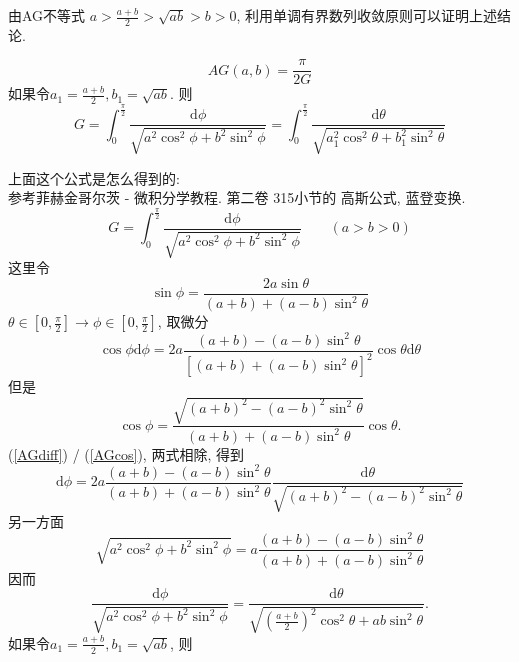 由AG不等式 $ a>\frac{a+b}{2}>\sqrt{ab}>b>0 $, 
利用单调有界数列收敛原则可以证明上述结论.

\begin{equation}\label{AGineqAns}
	AG(a,b)=\frac{\pi}{2G}
\end{equation}
如果令$ a_1 = \frac{a+b}{2}, b_1 = \sqrt{ab} $. 则
\begin{equation}\label{GaussAGineqInt}
	G = \int_{0}^{\frac{\pi}{2}}\frac{\text{d}\phi}{\sqrt{a^2\cos^2\phi+b^2\sin^2\phi}} 
	= \int_{0}^{\frac{\pi}{2}}\frac{\text{d}\theta}{\sqrt{a_1^2\cos^2\theta+b_1^2\sin^2\theta}} 
\end{equation}

上面这个公式是怎么得到的:\\
参考菲赫金哥尔茨 - 微积分学教程. 第二卷 315小节的 高斯公式, 蓝登变换.\\
\begin{equation}\label{GaussAGineqInt001}
	G = \int_{0}^{\frac{\pi}{2}}\frac{\text{d}\phi}{\sqrt{a^2\cos^2\phi+b^2\sin^2\phi}} \qquad (a>b>0)
\end{equation}
这里令
\begin{equation}\label{LandenTf}
	\sin\phi = \frac{2a\sin\theta}{(a+b)+(a-b)\sin^2\theta}
\end{equation}
$ \theta \in[0,\frac{\pi}{2}] \rightarrow  \phi \in[0,\frac{\pi}{2}] $,
取微分
\begin{equation}\label{AGdiff}
	\cos\phi\text{d}\phi = 2a\frac{(a+b)-(a-b)\sin^2\theta}{[(a+b)+(a-b)\sin^2\theta]^2}\cos\theta\text{d}\theta
\end{equation}
但是
\begin{equation}\label{AGcos}
	\cos\phi = \frac{\sqrt{(a+b)^2-(a-b)^2\sin^2\theta}}{(a+b)+(a-b)\sin^2\theta}\cos\theta.
\end{equation}
(\ref{AGdiff}) / (\ref{AGcos}), 两式相除, 得到
\begin{equation}
	\text{d}\phi = 2a\frac{(a+b)-(a-b)\sin^2\theta}{(a+b)+(a-b)\sin^2\theta}\frac{\text{d}\theta}{\sqrt{(a+b)^2-(a-b)^2\sin^2\theta}}
\end{equation}
另一方面
\begin{equation}
	\sqrt{a^2\cos^2\phi+b^2\sin^2\phi} = a\frac{(a+b)-(a-b)\sin^2\theta}{(a+b)+(a-b)\sin^2\theta}
\end{equation}
因而
\begin{equation}
	\frac{\text{d}\phi}{\sqrt{a^2\cos^2\phi+b^2\sin^2\phi} }
	= \frac{\text{d}\theta}{\sqrt{(\frac{a+b}{2})^2\cos^2\theta+ab\sin^2\theta}}.
\end{equation}
如果令$ a_1 = \frac{a+b}{2}, b_1 = \sqrt{ab} $, 则
